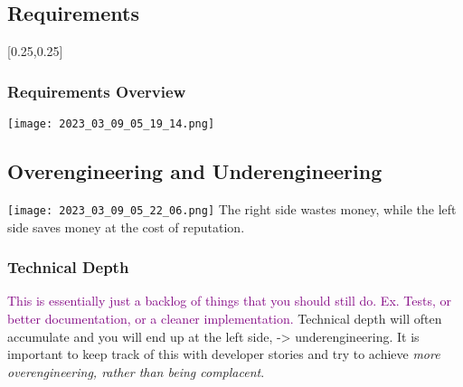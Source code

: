 \documentclass[main.tex,fontsize=8pt,paper=a4,paper=portrait,DIV=calc,]{scrartcl}
\begin{document}
\subsection{Requirements}
[0.25,0.25]

\subsubsection{Requirements Overview}
\texttt{[image: 2023\_03\_09\_05\_19\_14.png]}

\subsection{Overengineering and Underengineering}
\texttt{[image: 2023\_03\_09\_05\_22\_06.png]}\newline
The right side wastes money, while the left side saves money at the cost of reputation.

\subsubsection{Technical Depth}
\textcolor{purple}{This is essentially just a backlog of things that you should still do. Ex. Tests, or better documentation, or a cleaner implementation.}\newline
Technical depth will often accumulate and you will end up at the left side, -> underengineering.\newline
It is important to keep track of this with developer stories and try to achieve \emph{more overengineering, rather than being complacent}.
\end{document}
